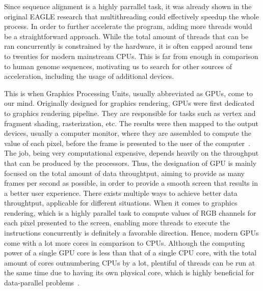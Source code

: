 \documentclass{PHlab-thesis}
\begin{document}
Since sequence alignment is a highly parrallel task, it was already shown in the original EAGLE research that multithreading could effectively speedup the whole process. In order to further accelerate the program, adding more threads would be a straightforward approach. While the total amount of threads that can be ran concurrently is constrained by the hardware, it is often capped around tens to twenties for modern mainstream CPUs. This is far from enough in comparison to human genome sequences, motivating us to search for other sources of acceleration, including the usage of additional devices. 

This is when Graphics Processing Units, usually abbreviated as GPUs, come to our mind. Originally designed for graphics rendering, GPUs were first dedicated to graphics rendering pipeline. They are responsible for tasks such as vertex and fragment shading, rasterization, etc. The results were then mapped to the output devices, usually a computer monitor, where they are assembled to compute the value of each pixel, before the frame is presented to the user of the computer~\cite{foley1994introduction,owens2008gpu}. The job, being very computational expensive, depends heavily on the throughput that can be produced by the processors. Thus, the designation of GPU is mainly focused on the total amount of data throughtput, aiming to provide as many frames per second as possible, in order to provide a smooth screen that results in a better user experience. There exists multiple ways to achieve better data throughtput, applicable for different situations. When it comes to graphics rendering, which is a highly parallel task to compute values of RGB channels for each pixel presented to the screen, enabling more threads to execute the instructions concurrently is definitely a favorable direction. Hence, modern GPUs come with a lot more cores in comparison to CPUs. Although the computing power of a single GPU core is less than that of a single CPU core, with the total amount of cores outnumbering CPUs by a lot, plentiful of threads can be run at the same time due to having its own physical core, which is highly beneficial for data-parallel problems~\cite{navarro2014survey}. 
\end{document}
